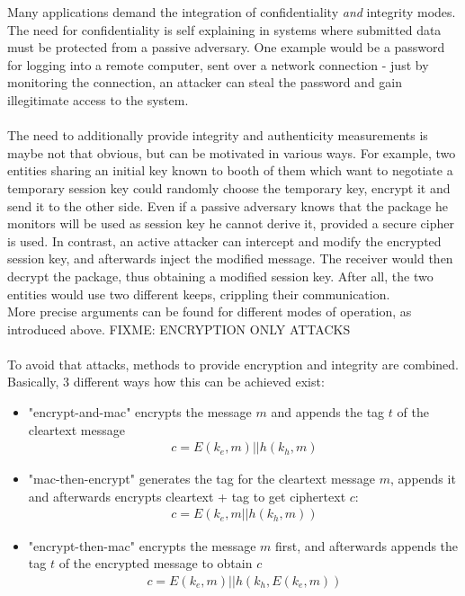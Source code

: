 Many applications demand the integration of confidentiality \textit{and} integrity modes. The need for confidentiality is self explaining in systems where
submitted data must be protected from a passive adversary. One example would be a password for logging into a remote computer, sent over a network connection
- just by monitoring the connection, an attacker can steal the password and gain illegitimate access to the system.
\\
\\
The need to additionally provide integrity and authenticity measurements is maybe not that obvious, but can be motivated in various ways. For example, two entities
sharing an initial key known to booth of them which want to negotiate a temporary session key could randomly choose the temporary key, encrypt it and send it
to the other side. Even if a passive adversary knows that the package he monitors will be used as session key he cannot derive it, provided a secure cipher is
used.  In contrast, an active attacker can intercept and modify the encrypted session key, and afterwards inject the modified message. The receiver
would then decrypt the package, thus obtaining a modified session key. After all, the two entities would use two different keeps, crippling their communication.
\\
More precise arguments can be found for different modes of operation, as introduced above. FIXME: ENCRYPTION ONLY ATTACKS
\\
\\
To avoid that attacks, methods to provide encryption and integrity are combined. Basically, 3 different ways how this can be achieved exist:

\begin{itemize}
 \item "encrypt-and-mac" encrypts the message $m$ and appends the tag $t$ of the cleartext message
 \begin{align}\label{encAndMac}
  c = E(k_e, m) || h(k_h, m)
 \end{align}
 \item "mac-then-encrypt" generates the tag for the cleartext message $m$, appends it and afterwards encrypts cleartext + tag to get ciphertext $c$:
 \begin{align}\label{macThenEnc}
  c = E(k_e, m || h(k_h, m))
 \end{align}
 \item "encrypt-then-mac" encrypts the message $m$ first, and afterwards appends the tag $t$ of the encrypted message to obtain $c$
 \begin{align}\label{encThenMac}
  c = E(k_e, m) || h(k_h, E(k_e, m))
 \end{align}
\end{itemize}

